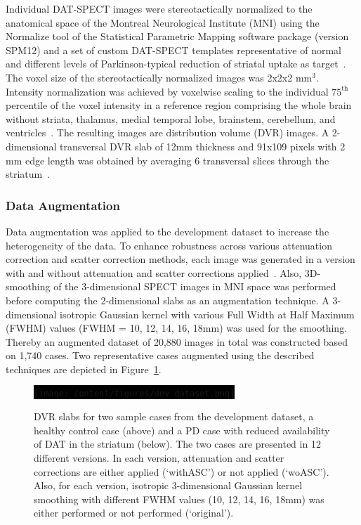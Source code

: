

Individual DAT-SPECT images were stereotactically normalized to the anatomical space of the Montreal Neurological Institute (MNI) 
using the Normalize tool of the Statistical Parametric Mapping software package (version SPM12) and a set of custom DAT-SPECT templates 
representative of normal and different levels of Parkinson-typical reduction of striatal uptake as target~\citep{Apostolova2023-ec}.
The voxel size of the stereotactically normalized images was 2x2x2 mm$^{3}$. 
Intensity normalization was achieved by voxelwise scaling to the individual $75^{\text{th}}$ percentile of the voxel intensity in a reference region 
comprising the whole brain without striata, thalamus, medial temporal lobe, brainstem, cerebellum, and ventricles~\citep{Kupitz2014-ll}.
The resulting images are distribution volume (DVR) images. 
A 2-dimensional transversal DVR slab of 12mm thickness and 91x109 pixels with 2 mm edge length was obtained 
by averaging 6 transversal slices through the striatum~\citep{Buchert2006-pt}.

\subsubsection{Data Augmentation}
\label{subsec:augment}

Data augmentation was applied to the development dataset to increase the heterogeneity of the data.
To enhance robustness across various attenuation correction and scatter correction methods, 
each image was generated in a version with and without attenuation and scatter corrections applied~\citep{Schiebler2023}.
Also, 3D-smoothing of the 3-dimensional SPECT images in MNI space 
was performed before computing the 2-dimensional slabs as an augmentation technique.
A 3-dimensional isotropic Gaussian kernel with various Full Width at Half Maximum (FWHM) 
values (FWHM = 10, 12, 14, 16, 18mm) was used for the smoothing.
Thereby an augmented dataset of 20,880 images in total was constructed based on 1,740 cases.
Two representative cases augmented using the described techniques are depicted in Figure~\ref{fig:dev_dataset}.

\begin{figure}[t]
    \centering
    \colorbox{black}{%
     \texttt{[image: content/figures/dev\_dataset.png]}%
     }
    \caption{DVR slabs for two sample cases from the development dataset, 
    a healthy control case (above) and a PD case with reduced availability of DAT in the striatum (below).
    The two cases are presented in 12 different versions.
    In each version, attenuation and scatter corrections are either applied (`withASC') or not applied (`woASC').
    Also, for each version, isotropic 3-dimensional Gaussian kernel smoothing with different FWHM values (10, 12, 14, 16, 18mm) was 
    either performed or not performed (`original').} 
    \label{fig:dev_dataset}
\end{figure}

